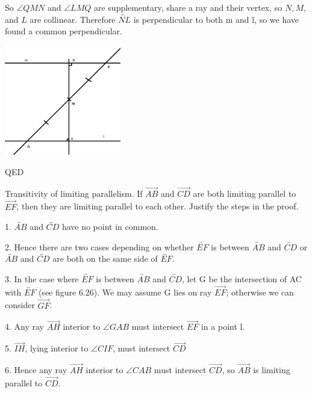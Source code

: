 \documentclass[12pt,letterpaper]{article}
\newcommand{\QED}{\begin{flushright}QED\end{flushright}}
\newcommand{\prob}[1]{\newpage\noindent {\bf #1}}
\begin{document}
So $\angle QMN$ and $\angle LMQ$ are supplementary, share a ray and their vertex, so $N,M,$ and $L$ are collinear.  Therefore $\overleftrightarrow{NL}$ is perpendicular to both m and l, so we have found a common perpendicular.  

\begin{center}
\includegraphics[width=2in]{perpendiculars.png}
\end{center}

\QED





\prob{Major Exercises 3 }

Transitivity of limiting parallelism.  If $\overrightarrow{AB}$ and $\overrightarrow{CD}$ are both limiting parallel to $\overrightarrow{EF}$, then they are limiting parallel to each other. Justify the steps in the proof.  

1. $\overleftrightarrow{AB}$ and $\overleftrightarrow{CD}$ have no point in common.

2. Hence there are two cases depending on whether $\overleftrightarrow{EF}$ is between $\overleftrightarrow{AB}$ and $\overleftrightarrow{CD}$ or $\overleftrightarrow{AB}$ and $\overleftrightarrow{CD}$ are both on the same side of $\overleftrightarrow{EF}$.

3. In the case where $\overleftrightarrow{EF}$ is between $\overleftrightarrow{AB}$ and $\overleftrightarrow{CD}$, let G be the intersection of AC with $\overleftrightarrow{EF}$ (see figure 6.26).  We may assume G lies on ray $\overrightarrow{EF}$; otherwise we can consider $\overrightarrow{GF}$.

4. Any ray $\overrightarrow{AH}$ interior to $\angle GAB$ must intersect $\overrightarrow{EF}$ in a point l.

5. $\overrightarrow{IH}$, lying interior to $\angle CIF$, must intersect $\overrightarrow{CD}$

6. Hence any ray $\overrightarrow{AH}$ interior to $\angle CAB$ must intersect $\overrightarrow{CD}$, so $\overrightarrow{AB}$ is limiting parallel to $\overrightarrow{CD}$. 
\end{document}
